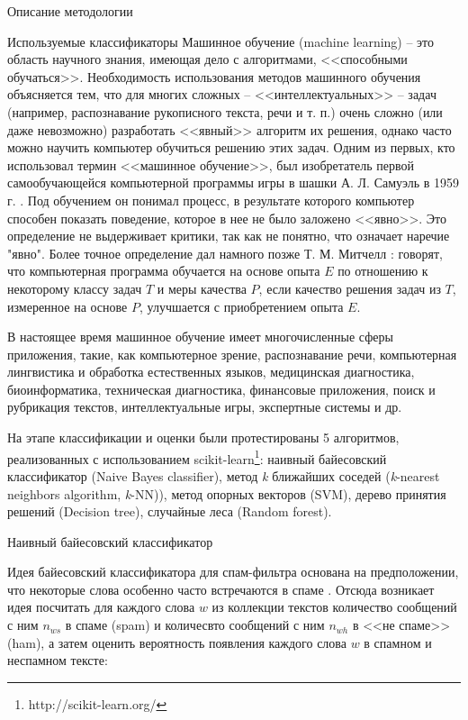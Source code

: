\begin{section}{Описание методологии}
\begin{subsection}{Используемые классификаторы}
    Машинное обучение (machine learning) – это область научного знания, имеющая дело с алгоритмами, <<способными обучаться>>. Необходимость использования методов машинного обучения объясняется тем, что для многих сложных – <<интеллектуальных>> – задач (например, распознавание рукописного текста, речи и т. п.) очень сложно (или даже невозможно) разработать <<явный>> алгоритм их решения, однако часто можно научить компьютер обучиться решению этих задач. Одним из первых, кто использовал термин <<машинное обучение>>, был изобретатель первой самообучающейся компьютерной программы игры в шашки А. Л. Самуэль в 1959 г. \cite{Samuel}. Под обучением он понимал процесс, в результате которого компьютер способен показать поведение, которое в нее не было заложено <<явно>>. Это определение не выдерживает критики, так как не понятно, что означает наречие "явно". Более точное определение дал намного позже Т. М. Митчелл \cite{Mitchell}: говорят, что компьютерная программа обучается на основе опыта $E$ по отношению к некоторому классу задач $T$ и меры качества $P$, если качество решения задач из $T$, измеренное на основе $P$, улучшается с приобретением опыта $E$.

    В настоящее время машинное обучение имеет многочисленные сферы приложения, такие, как компьютерное зрение, распознавание речи, компьютерная лингвистика и обработка естественных языков, медицинская диагностика, биоинформатика, техническая диагностика, финансовые приложения, поиск и рубрикация текстов, интеллектуальные игры, экспертные системы и др.


    На этапе классификации и оценки были протестированы 5 алгоритмов, реализованных с использованием scikit-learn\footnote{http://scikit-learn.org/}: наивный байесовский классификатор (Naive Bayes classifier),
    метод \textit{k} ближайших соседей (\textit{k}-nearest neighbors algorithm, \textit{k}-NN)), метод опорных векторов (SVM), дерево принятия решений (Decision tree), случайные леса (Random forest).

    \begin{subsubsection}{Наивный байесовский классификатор}

Идея байесовский классификатора для спам-фильтра основана на предположении,
что некоторые слова особенно часто встречаются в спаме \cite{wiki:nb}. Отсюда возникает идея посчитать для каждого слова $w$ из коллекции текстов количество сообщений с ним $n_{ws}$
в спаме (spam) и количесвто сообщений с ним $n_{wh}$ в <<не спаме>> (ham), а затем оценить вероятность появления каждого слова $w$ в спамном и неспамном тексте:


\end{subsubsection}
\end{subsection}
\end{section}
